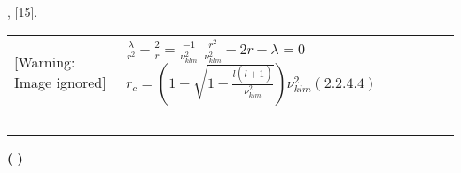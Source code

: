 \documentclass[a4paper]{article}
\begin{document}
{\CYRD}{\cyra}{\cyrn}{\cyrn}{\cyru}{\cyryu} {\cyrp}{\cyrr}{\cyro}{\cyrb}{\cyrl}{\cyre}{\cyrm}{\cyru}
{\cyrm}{\cyro}{\cyrzh}{\cyrn}{\cyro} {\cyrr}{\cyre}{\cyrsh}{\cyri}{\cyrt}{\cyrsftsn}
{\cyrp}{\cyru}{\cyrt}{\cyre}{\cyrm} {\cyrv}{\cyrv}{\cyre}{\cyrd}{\cyre}{\cyrn}{\cyri}{\cyrya}
{\cyrerev}{\cyrf}{\cyrf}{\cyre}{\cyrk}{\cyrt}{\cyri}{\cyrv}{\cyrn}{\cyro}{\cyrg}{\cyro}
{\cyrr}{\cyra}{\cyrd}{\cyri}{\cyru}{\cyrs}{\cyra}, {\cyrk}{\cyro}{\cyrt}{\cyro}{\cyrr}{\cyrery}{\cyrishrt}
{\cyrp}{\cyrr}{\cyre}{\cyrd}{\cyrs}{\cyrt}{\cyra}{\cyrv}{\cyrl}{\cyrya}{\cyre}{\cyrt}
{\cyrs}{\cyro}{\cyrb}{\cyro}{\cyrishrt}
{\cyrk}{\cyrl}{\cyra}{\cyrs}{\cyrs}{\cyri}{\cyrch}{\cyre}{\cyrs}{\cyrk}{\cyru}{\cyryu}
{\cyrt}{\cyro}{\cyrch}{\cyrk}{\cyru} {\cyrp}{\cyro}{\cyrv}{\cyro}{\cyrr}{\cyro}{\cyrt}{\cyra} [15].

\begin{flushleft}
\tablefirsthead{}
\tablehead{}
\tabletail{}
\tablelasttail{}
\begin{supertabular}{m{6.9900002cm}m{1.051cm}m{8.24cm}}
  [Warning: Image ignored] %
  &
\\
 &
~
\\
\end{supertabular}
\end{flushleft}

\bigskip

\textbf{{\CYRS}{\cyrv}{\cyro}{\cyrd}{\cyrn}{\cyra}{\cyrya} {\cyrt}{\cyra}{\cyrb}{\cyrl}{\cyri}{\cyrc}{\cyra}
({\cyrd}{\cyrl}{\cyrya} {\cyrr}{\cyra}{\cyrd}{\cyri}{\cyra}{\cyrl}{\cyrsftsn}{\cyrn}{\cyro}{\cyrishrt}
{\cyrch}{\cyra}{\cyrs}{\cyrt}{\cyri})}
\end{document}
